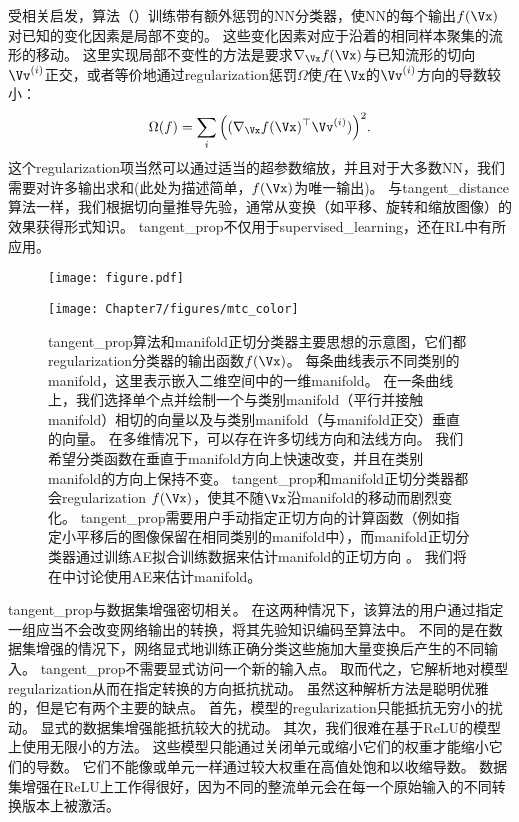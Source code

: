 受相关启发，算法\citep{Simard92-short}（）训练带有额外惩罚的\gls{NN}分类器，使\gls{NN}的每个输出$f(\Vx)$对已知的变化因素是局部不变的。
这些变化因素对应于沿着的相同样本聚集的流形的移动。
这里实现局部不变性的方法是要求$\nabla_{\Vx} f(\Vx)$与已知流形的切向$\Vv^{(i)}$正交，或者等价地通过\gls{regularization}惩罚$\Omega$使$f$在$\Vx$的$\Vv^{(i)}$方向的导数较小：
\begin{align} \label{eq:767}
 \Omega(f) = \sum_i \Big((\nabla_{\Vx} f(\Vx)^\top \Vv^{(i)}) \Big)^2 .
\end{align}
这个\gls{regularization}项当然可以通过适当的超参数缩放，并且对于大多数\gls{NN}，我们需要对许多输出求和(此处为描述简单，$f(\Vx)$为唯一输出)。
与\gls{tangent_distance}算法一样，我们根据切向量推导先验，通常从变换（如平移、旋转和缩放图像）的效果获得形式知识。
\gls{tangent_prop}不仅用于\gls{supervised_learning}\citep{Simard92-short}，还在\gls{RL}\citep{Thrun-NIPS1994}中有所应用。
\begin{figure}[!htb]
\ifOpenSource
\centerline{\texttt{[image: figure.pdf]}}
\else
\centerline{\texttt{[image: Chapter7/figures/mtc\_color]}}
\fi
\caption{\gls{tangent_prop}算法\citep{Simard92-short}和\gls{manifold}正切分类器主要思想的示意图\citep{Dauphin-et-al-NIPS2011-small}，它们都\gls{regularization}分类器的输出函数$f(\Vx)$。
每条曲线表示不同类别的\gls{manifold}，这里表示嵌入二维空间中的一维\gls{manifold}。
在一条曲线上，我们选择单个点并绘制一个与类别\gls{manifold}（平行并接触\gls{manifold}）相切的向量以及与类别\gls{manifold}（与\gls{manifold}正交）垂直的向量。
在多维情况下，可以存在许多切线方向和法线方向。
我们希望分类函数在垂直于\gls{manifold}方向上快速改变，并且在类别\gls{manifold}的方向上保持不变。
\gls{tangent_prop}和\gls{manifold}正切分类器都会\gls{regularization} $f(\Vx)$，使其不随$\Vx$沿\gls{manifold}的移动而剧烈变化。
\gls{tangent_prop}需要用户手动指定正切方向的计算函数（例如指定小平移后的图像保留在相同类别的\gls{manifold}中），而\gls{manifold}正切分类器通过训练\gls{AE}拟合训练数据来估计\gls{manifold}的正切方向 。
我们将在中讨论使用\gls{AE}来估计\gls{manifold}。
}
\label{fig:chap7_mtc_color}
\end{figure}

\gls{tangent_prop}与数据集增强密切相关。
在这两种情况下，该算法的用户通过指定一组应当不会改变网络输出的转换，将其先验知识编码至算法中。
不同的是在数据集增强的情况下，网络显式地训练正确分类这些施加大量变换后产生的不同输入。
\gls{tangent_prop}不需要显式访问一个新的输入点。
取而代之，它解析地对模型\gls{regularization}从而在指定转换的方向抵抗扰动。
虽然这种解析方法是聪明优雅的，但是它有两个主要的缺点。
首先，模型的\gls{regularization}只能抵抗无穷小的扰动。
显式的数据集增强能抵抗较大的扰动。
其次，我们很难在基于\gls{ReLU}的模型上使用无限小的方法。
这些模型只能通过关闭单元或缩小它们的权重才能缩小它们的导数。
它们不能像或单元一样通过较大权重在高值处饱和以收缩导数。
数据集增强在\gls{ReLU}上工作得很好，因为不同的整流单元会在每一个原始输入的不同转换版本上被激活。

